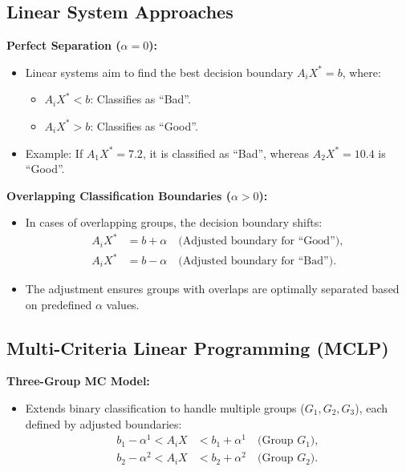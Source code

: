 \documentclass[12pt,a4paper]{article}
\begin{document}
\subsection{Linear System Approaches}

\textbf{Perfect Separation (\(\alpha = 0\)):}
\begin{itemize}
    \item Linear systems aim to find the best decision boundary \(A_i X^* = b\), where:
    \begin{itemize}
        \item \(A_i X^* < b\): Classifies as ``Bad''.
        \item \(A_i X^* > b\): Classifies as ``Good''.
    \end{itemize}
    \item Example: If \(A_1X^* = 7.2\), it is classified as ``Bad'', whereas \(A_2X^* = 10.4\) is ``Good''.
\end{itemize}

\textbf{Overlapping Classification Boundaries (\(\alpha > 0\)):}
\begin{itemize}
    \item In cases of overlapping groups, the decision boundary shifts:
    \begin{align*}
        A_iX^* &= b + \alpha \quad \text{(Adjusted boundary for ``Good'')}, \\
        A_iX^* &= b - \alpha \quad \text{(Adjusted boundary for ``Bad'')}.
    \end{align*}
    \item The adjustment ensures groups with overlaps are optimally separated based on predefined \(\alpha\) values.
\end{itemize}

\subsection{Multi-Criteria Linear Programming (MCLP)}

\textbf{Three-Group MC Model:}
\begin{itemize}
    \item Extends binary classification to handle multiple groups (\(G_1, G_2, G_3\)), each defined by adjusted boundaries:
    \begin{align*}
        b_1 - \alpha^1 < A_iX &< b_1 + \alpha^1 \quad \text{(Group \(G_1\))}, \\
        b_2 - \alpha^2 < A_iX &< b_2 + \alpha^2 \quad \text{(Group \(G_2\))}.
    \end{align*}
\end{itemize}
\end{document}
